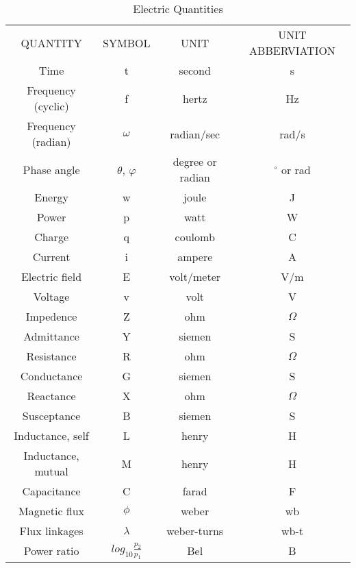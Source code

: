 \begin{table}[h]
	\begin{center}
	\begin{tabular}{c|c|c|c}
		\toprule 
		QUANTITY & SYMBOL & UNIT & UNIT ABBERVIATION 	\\
		Time & t & second & s				\\
		Frequency (cyclic) & f & hertz & Hz \\
		Frequency (radian) & $\omega $& radian/sec & rad/s	\\
		Phase angle &$\theta $, $\varphi $ & degree or radian & $^{\circ}$ or rad \\
		Energy & w & joule & J 	\\
		Power & p & watt & W	\\
		Charge & q  &coulomb & C	\\
		Current & i & ampere  &A	\\
		Electric field & E & volt/meter& V/m	\\
		Voltage & v & volt &V	\\
		Impedence & Z & ohm & $\varOmega$	\\
		Admittance &Y &siemen &S	\\
		Resistance &R &ohm &$\varOmega$	\\
		Conductance& G &siemen &S	\\
		Reactance &X &ohm &$\varOmega$	\\
		Susceptance &B &siemen& S	\\
		Inductance, self &L &henry& H	\\
		Inductance, mutual& M &henry& H	\\
		Capacitance& C& farad &F	\\
		Magnetic flux& $\phi$& weber &wb	\\
		Flux linkages& $\lambda$& weber-turns& wb-t	\\
		Power ratio& $log_{10}\frac{p_2}{p_1}$& Bel &B	\\
		\bottomrule
	\end{tabular}
	\caption{Electric Quantities}
\end{center}
\end{table}
